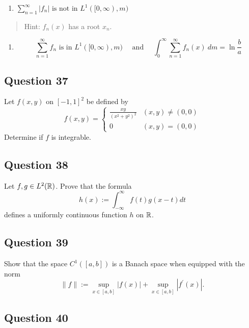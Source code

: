 \documentclass[12pt]{article}
\providecommand{\tightlist}{%
  \setlength{\itemsep}{0pt}\setlength{\parskip}{0pt}}
\begin{document}
\begin{enumerate}
\def\labelenumi{\alph{enumi}.}
\tightlist
\item
  \(\sum_{n=1}^{\infty}\left|f_{n}\right| \text { is not in } L^{1}([0, \infty), m)\)
\end{enumerate}

\begin{quote}
Hint: \(f_n(x)\) has a root \(x_n\).
\end{quote}

\begin{enumerate}
\def\labelenumi{\alph{enumi}.}
\setcounter{enumi}{1}
\tightlist
\item
  \[
  \sum_{n=1}^{\infty} f_{n} \text { is in } L^{1}([0, \infty), m) 
  \quad \text { and } \quad 
  \int_{0}^{\infty} \sum_{n=1}^{\infty} f_{n}(x) ~d m=\ln \frac{b}{a}
  \]
\end{enumerate}

\hypertarget{question-37-1}{%
\subsection{Question 37}\label{question-37-1}}

Let \(f(x, y)\) on \([-1, 1]^2\) be defined by \[
f(x, y) = \begin{cases}
\frac{x y}{\left(x^{2}+y^{2}\right)^{2}} & (x, y) \neq (0, 0) \\
0 & (x, y) = (0, 0)
\end{cases}
\] Determine if \(f\) is integrable.

\hypertarget{question-38-1}{%
\subsection{Question 38}\label{question-38-1}}

Let \(f, g \in L^2({\mathbb{R}})\). Prove that the formula \[
h(x):=\int_{-\infty}^{\infty} f(t) g(x-t) d t
\] defines a uniformly continuous function \(h\) on \({\mathbb{R}}\).

\hypertarget{question-39-1}{%
\subsection{Question 39}\label{question-39-1}}

Show that the space \(C^1([a, b])\) is a Banach space when equipped with
the norm \[
\|f\|:=\sup _{x \in[a, b]}|f(x)|+\sup _{x \in[a, b]}\left|f^{\prime}(x)\right|.
\]

\hypertarget{question-40-1}{%
\subsection{Question 40}\label{question-40-1}}
\end{document}
